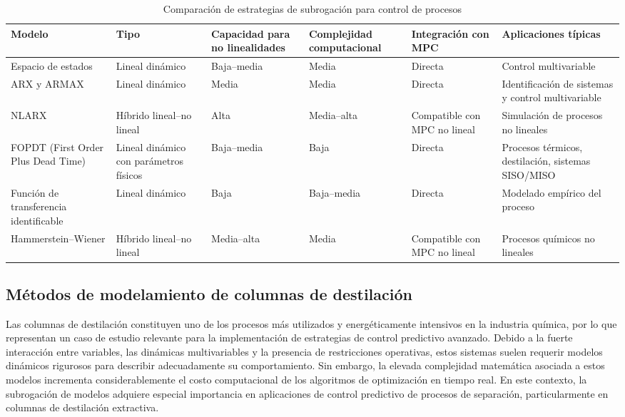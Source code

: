 \begin{table}[H]
\centering
\small
\caption{Comparación de estrategias de subrogación para control de procesos}
\label{tab:comparacion_modelos}

\renewcommand{\arraystretch}{1.4}
\begin{tabular}{
p{2.8cm}
p{2.6cm}
p{2.8cm}
p{2.8cm}
p{2.6cm}
p{3.0cm}
}
\hline
\textbf{Modelo} &
\textbf{Tipo} &
\textbf{Capacidad para no linealidades} &
\textbf{Complejidad computacional} &
\textbf{Integración con MPC} &
\textbf{Aplicaciones típicas}
\\
\hline
Espacio de estados &
Lineal dinámico &
Baja--media &
Media &
Directa &
Control multivariable
\\
ARX y ARMAX &
Lineal dinámico &
Media &
Media &
Directa &
Identificación de sistemas y control multivariable
\\
NLARX &
Híbrido lineal--no lineal &
Alta &
Media--alta &
Compatible con MPC no lineal &
Simulación de procesos no lineales
\\
FOPDT (First Order Plus Dead Time) &
Lineal dinámico con parámetros físicos &
Baja--media &
Baja &
Directa &
Procesos térmicos, destilación, sistemas SISO/MISO
\\
Función de transferencia identificable &
Lineal dinámico &
Baja &
Baja--media &
Directa &
Modelado empírico del proceso
\\
Hammerstein--Wiener &
Híbrido lineal--no lineal &
Media--alta &
Media &
Compatible con MPC no lineal &
Procesos químicos no lineales
\\
\hline
\end{tabular}
\end{table}

\subsection{Métodos de modelamiento de columnas de destilación}

Las columnas de destilación constituyen uno de los procesos más utilizados y energéticamente intensivos en la industria química, por lo que representan un caso de estudio relevante para la implementación de estrategias de control predictivo avanzado. Debido a la fuerte interacción entre variables, las dinámicas multivariables y la presencia de restricciones operativas, estos sistemas suelen requerir modelos dinámicos rigurosos para describir adecuadamente su comportamiento. Sin embargo, la elevada complejidad matemática asociada a estos modelos incrementa considerablemente el costo computacional de los algoritmos de optimización en tiempo real. En este contexto, la subrogación de modelos adquiere especial importancia en aplicaciones de control predictivo de procesos de separación, particularmente en columnas de destilación extractiva.

